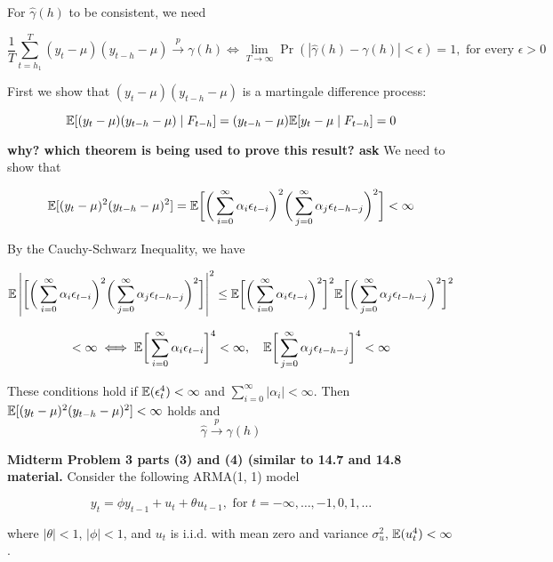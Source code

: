 \begin{enumerate}[(a)]
For \(\hat{\gamma}(h)\) to be consistent, we need

\[
\frac{1}{T}\sum_{t=h_1}^T (y_t - \mu)(y_{t-h} - \mu) \xrightarrow{p} \gamma(h) \iff \lim_{T \to \infty} \Pr(|\hat{\gamma}(h)-\gamma(h)| < \epsilon) = 1, \text{ for every } \epsilon > 0
\]

First we show that \((y_t - \mu)(y_{t-h} - \mu)\) is a martingale difference process:

\[
\mathbb{E}[(y_t - \mu)(y_{t-h} - \mu) \mid F_{t-h}] =(y_{t-h} - \mu)  \mathbb{E}[y_t - \mu \mid F_{t-h}] = 0
\]

\textbf{why? which theorem is being used to prove this result? ask} We need to show that

\[
\mathbb{E}[(y_t - \mu)^2(y_{t-h} - \mu)^2 ] = \mathbb{E} \bigg[ \bigg( \sum_{i=0}^\infty \alpha_i \epsilon_{t-i} \bigg)^2 \bigg( \sum_{j=0}^\infty \alpha_j \epsilon_{t - h - j} \bigg) ^2 \bigg] < \infty
\]

By the Cauchy-Schwarz Inequality, we have

\[
\mathbb{E} \left| \bigg[ \bigg( \sum_{i=0}^\infty \alpha_i \epsilon_{t-i} \bigg)^2 \bigg( \sum_{j=0}^\infty \alpha_j \epsilon_{t - h - j} \bigg) ^2 \bigg] \right| ^2 \leq \mathbb{E} \bigg[ \bigg( \sum_{i=0}^\infty \alpha_i \epsilon_{t-i} \bigg)^2\bigg]^2 \mathbb{E} \bigg[ \bigg( \sum_{j=0}^\infty \alpha_j \epsilon_{t - h - j} \bigg) ^2\bigg]^2
\]

\[
< \infty \iff \mathbb{E} \bigg[ \sum_{i=0}^\infty \alpha_i \epsilon_{t-i}\bigg]^4 < \infty, \ \ \  \mathbb{E} \bigg[ \sum_{j=0}^\infty \alpha_j \epsilon_{t - h - j} \bigg]^4 < \infty
\]

These conditions hold if \(\mathbb{E}(\epsilon_t^4) < \infty\) and \(\sum_{i=0}^\infty |\alpha_i| < \infty\). Then \(\mathbb{E}[(y_t - \mu)^2(y_{t-h} - \mu)^2 ] < \infty\) holds and
\[
\hat{\gamma} \xrightarrow{p} \gamma(h)
\]

\end{enumerate}

\textbf{Midterm Problem 3 parts (3) and (4) (similar to 14.7 and 14.8 material.} Consider the following ARMA(1, 1) model

\[
y_t = \phi y_{t-1} + u_t + \theta u_{t-1}, \text{ for } t = - \infty, \ldots, -1, 0 , 1, \ldots
\]

where \(|\theta| < 1\), \(|\phi| < 1\), and \(u_t\) is i.i.d. with mean zero and variance \(\sigma_u^2\), \(\mathbb{E}(u_t^4) < \infty\).


